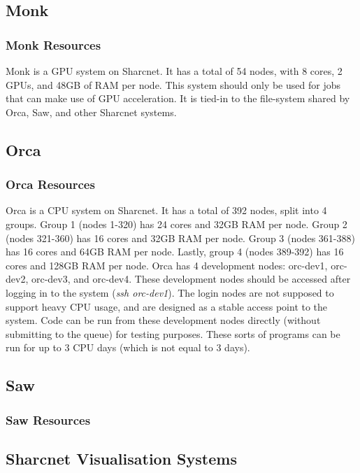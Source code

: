 \documentclass[12pt]{article}
\begin{document}
\subsection{Monk}

\subsubsection{Monk Resources}
\quad Monk is a GPU system on Sharcnet. It has a total of 54 nodes, with 8 cores, 2 GPUs, and 48GB of RAM per node. This system should only be used for jobs that can make use of GPU acceleration. It is tied-in to the file-system shared by Orca, Saw, and other Sharcnet systems.

\subsection{Orca}

\subsubsection{Orca Resources}

\quad Orca is a CPU system on Sharcnet. It has a total of 392 nodes, split into 4 groups. Group 1 (nodes 1-320) has 24 cores and 32GB RAM per node. Group 2 (nodes 321-360) has 16 cores and 32GB RAM per node. Group 3 (nodes 361-388) has 16 cores and 64GB RAM per node. Lastly, group 4 (nodes 389-392) has 16 cores and 128GB RAM per node. Orca has 4 development nodes: orc-dev1, orc-dev2, orc-dev3, and orc-dev4. These development nodes should be accessed after logging in to the system (\textit{ssh orc-dev1}). The login nodes are not supposed to support heavy CPU usage, and are designed as a stable access point to the system. Code can be run from these development nodes directly (without submitting to the queue) for testing purposes. These sorts of programs can be run for up to 3 CPU days (which is not equal to 3 days). 

\subsection{Saw}

\subsubsection{Saw Resources}

\subsection{Sharcnet Visualisation Systems}\label{visual}
\end{document}
